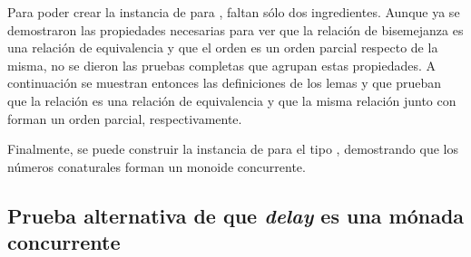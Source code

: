 Para poder crear la instancia de  para , faltan sólo dos ingredientes. Aunque ya se demostraron las propiedades necesarias para ver que la relación de bisemejanza es una relación de equivalencia y que el orden es un orden parcial respecto de la misma, no se dieron las pruebas completas que agrupan estas propiedades. A continuación se muestran entonces las definiciones de los lemas  y  que prueban que la relación \AgdaFunction{[ $\infty$ ]\_$\sim$\_} es una relación de equivalencia y que la misma relación junto con \AgdaFunction{[ $\infty$ ]\_$\leq$\_} forman un orden parcial, respectivamente.

Finalmente, se puede construir la instancia de  para el tipo , demostrando que los números conaturales forman un monoide concurrente. 

\subsection{Prueba alternativa de que \textit{delay} es una mónada concurrente}


